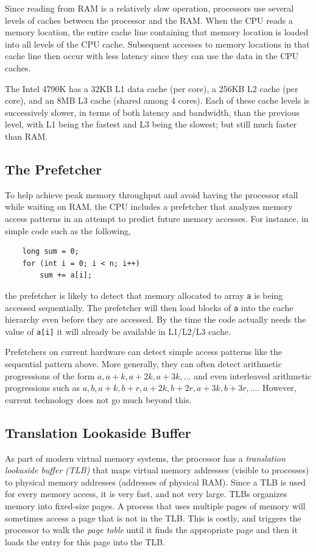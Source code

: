 \documentclass{patmorin}
\begin{document}
Since reading from RAM is a relatively slow operation, processors use
several levels of caches between the processor and the RAM.  When the
CPU reads a memory location, the entire cache line containing that memory
location is loaded into all levels of the CPU cache.  Subsequent accesses
to memory locations in that cache line then occur with less latency
since they can use the data in the CPU caches.

The Intel 4790K has a 32KB L1 data cache (per core), a 256KB L2 cache (per
core), and an 8MB L3 cache (shared among 4 cores).  Each of these cache
levels is successively slower, in terms of both latency and bandwidth,
than the previous level, with L1 being the fastest and L3 being the slowest;
but still much faster than RAM.

\subsection{The Prefetcher}

To help achieve peak memory throughput and avoid having the processor
stall while waiting on RAM, the CPU includes a prefetcher that analyzes
memory access patterns in an attempt to predict future memory accesses.
For instance, in simple code such as the following,
\begin{verbatim}
    long sum = 0;
    for (int i = 0; i < n; i++) 
        sum += a[i];
\end{verbatim}
the prefetcher is likely to detect that memory allocated to array
\texttt{a} is being accessed sequentially.  The prefetcher will
then load blocks of \texttt{a} into the cache hierarchy even
before they are accessed.  By the time the code actually needs the value
of \texttt{a[i]} it will already be available in L1/L2/L3 cache.

Prefetchers on current hardware can detect simple access patterns
like the sequential pattern above.  More generally, they can often
detect arithmetic progressions of the form $a,a+k,a+2k,a+3k,\ldots$
and even interleaved arithmetic progressions such as $a, b, a+k, b+r,
a+2k,b+2r,a+3k,b+3r,\ldots$.  However, current technology does not go
much beyond this.

\subsection{Translation Lookaside Buffer}

As part of modern virtual memory systems, the processor has a
\emph{translation lookaside buffer (TLB)} that maps virtual memory
addresses (visible to processes) to physical memory addresses (addresses
of physical RAM).  Since a TLB is used for every memory access, it is very
fast, and not very large.  TLBs organizes memory into fixed-size pages.
A process that uses multiple pages of memory will sometimes access a
page that is not in the TLB. This is costly, and triggers the processor
to walk the \emph{page table} until it finds the appropriate page and
then it loads the entry for this page into the TLB.
\end{document}
